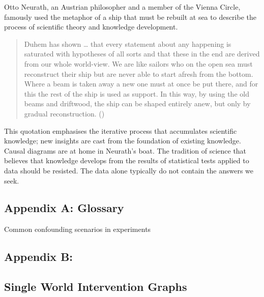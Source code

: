 \documentclass[
  single column]{article}
\begin{document}
Otto Neurath, an Austrian philosopher and a member of the Vienna Circle,
famously used the metaphor of a ship that must be rebuilt at sea to
describe the process of scientific theory and knowledge development.

\begin{quote}
Duhem has shown \ldots{} that every statement about any happening is
saturated with hypotheses of all sorts and that these in the end are
derived from our whole world-view. We are like sailors who on the open
sea must reconstruct their ship but are never able to start afresh from
the bottom. Where a beam is taken away a new one must at once be put
there, and for this the rest of the ship is used as support. In this
way, by using the old beams and driftwood, the ship can be shaped
entirely anew, but only by gradual reconstruction.
()
\end{quote}

This quotation emphasises the iterative process that accumulates
scientific knowledge; new insights are cast from the foundation of
existing knowledge. Causal diagrams are at home in Neurath's boat. The
tradition of science that believes that knowledge develops from the
results of statistical tests applied to data should be resisted. The
data alone typically do not contain the answers we seek.

\newpage{}

\subsection{Appendix A: Glossary}\label{appendix-a-glossary}

\begin{table}

\caption{\label{tbl-experiments}Common confounding scenarios in
experiments}

\centering{

\glossaryTerms

}

\end{table}%

\subsection{Appendix B:}\label{appendix-b}

\subsection{Single World Intervention
Graphs}\label{single-world-intervention-graphs}
\end{document}
